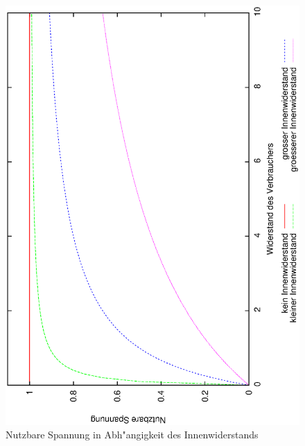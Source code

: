 \begin{figure}
   \centering
   \includegraphics[angle=-90,width=\textwidth]{bilder/innenwiderstand}
   \caption{Nutzbare Spannung in Abh"angigkeit des Innenwiderstands}
   \label{abb_innenwiderstand}
\end{figure}





